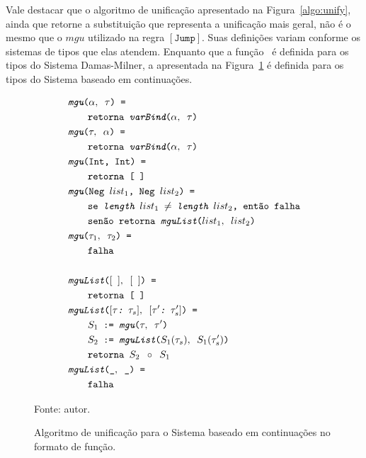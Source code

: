 Vale destacar que o algoritmo de unificação apresentado na Figura~\ref{algo:unify}, ainda que retorne a substituição que representa a unificação mais geral, não é o mesmo que o $\mathit{mgu}$ utilizado na regra $[\mathtt{Jump}]$.
Suas definições variam conforme os sistemas de tipos que elas atendem.
Enquanto que a função \Unify\ é definida para os tipos do Sistema Damas-Milner, a \Mgu apresentada na Figura~\ref{algo:mgu-cps} é definida para os tipos do Sistema baseado em continuações.

\begin{figure}[ht!]
  \centering
  \begin{align*}
    & \texttt{\Mgu($\alpha,\Whitespace\tau$) = } \\
    & \qquad{} \texttt{\Return\Whitespace\UnifyVar($\alpha,\Whitespace\tau$)} \\
    & \texttt{\Mgu($\tau,\Whitespace\alpha$) = } \\
    & \qquad{} \texttt{\Return\Whitespace\UnifyVar($\alpha,\Whitespace\tau$)} \\
    & \texttt{\Mgu(\texttt{Int},\Whitespace\texttt{Int}) = } \\
    & \qquad{} \texttt{\Return\Whitespace[$\Whitespace$]} \\
    & \texttt{\Mgu(\texttt{Neg}\Whitespace ${list}_{1}$,\Whitespace\texttt{Neg} ${list}_{2}$) = } \\
    & \qquad{} \texttt{\If \Whitespace \Length\Whitespace${list}_{1}$ $\neq$ \Length\Whitespace${list}_{2}$, \Then \Whitespace \Fail} \\
    & \qquad{} \texttt{\Else\Whitespace\Return\Whitespace\MguList(${list}_{1},\Whitespace{list}_{2}$)} \\
    & \texttt{\Mgu($\tau_1,\Whitespace\tau_2$) = } \\
    & \qquad{} \texttt{\Fail} \\
    \\
    & \texttt{\MguList($[\Whitespace],\Whitespace[\Whitespace]$) = } \\
    & \qquad{} \texttt{\Return\Whitespace[$\Whitespace$]} \\
    & \texttt{\MguList($[\tau\HeadSep\Whitespace\tau_s],\Whitespace[\tau'\HeadSep\Whitespace\tau_s']$) = } \\
    & \qquad{} \texttt{$S_1$\Whitespace:=\Whitespace\Mgu($\tau,\Whitespace\tau'$)} \\
    & \qquad{} \texttt{$S_2$\Whitespace:=\Whitespace\MguList($S_1(\tau_s),\Whitespace S_1(\tau_s')$)} \\
    & \qquad{} \texttt{\Return\Whitespace$S_2\Whitespace \circ\Whitespace S_1$} \\
    & \texttt{\MguList($\_,\Whitespace\_$) = } \\
    & \qquad{} \texttt{\Fail}
  \end{align*}
  \caption{Algoritmo de unificação para o Sistema baseado em continuações no formato de função.}
  \small{Fonte: autor.}
  \label{algo:mgu-cps}
\end{figure}

